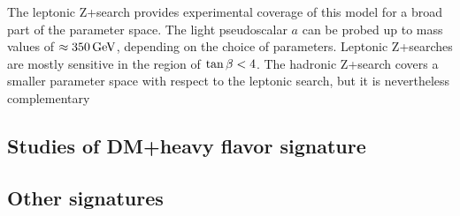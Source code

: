 The leptonic Z+\MET search provides experimental coverage of this model for a broad part of the parameter space. The light pseudoscalar $a$ can be probed up to mass values of $\approx\unit[350]{GeV}$, depending on the choice of parameters. Leptonic Z+\MET searches are mostly sensitive in the region of $\tan\beta<4$. The hadronic Z+\MET search covers a smaller parameter space with respect to the leptonic search, but it is nevertheless complementary 

\FloatBarrier

\subsection{Studies of DM+heavy flavor signature}
%

\subsection{Other signatures}


